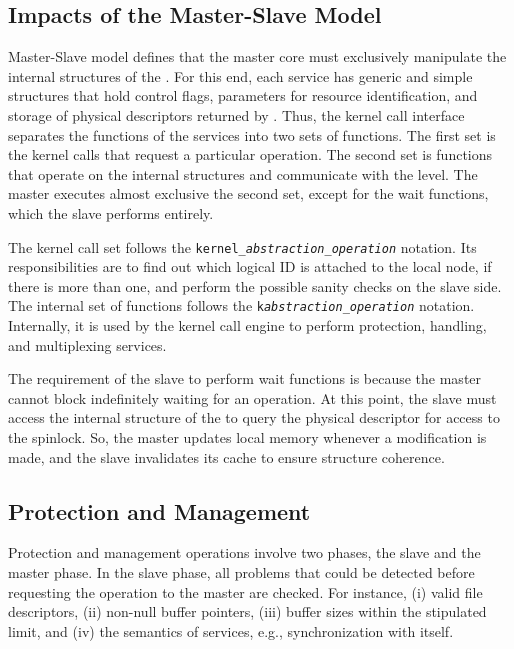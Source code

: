 		\subsection{Impacts of the Master-Slave Model}

			Master-Slave model defines that the master core must exclusively manipulate
			the internal structures of the \os. For this end, each service has generic and
			simple structures that hold control flags, parameters for resource
			identification, and storage of physical descriptors returned by \hal. Thus,
			the kernel call interface separates the functions of the services into two
			sets of functions. The first set is the kernel calls that request a particular
			operation. The second set is functions that operate on the internal structures
			and communicate with the \hal level. The master executes almost exclusive
			the second set, except for the wait functions, which the slave performs entirely.

			The kernel call set follows the \texttt{kernel\_\textit{abstraction}\_\textit{operation}}
			notation. Its responsibilities are to find out which logical ID is attached to
			the local node, if there is more than one, and perform the possible sanity
			checks on the slave side. The internal set of functions follows the
			\texttt{k\textit{abstraction}\_\textit{operation}} notation. Internally, it
			is used by the kernel call engine to perform protection, handling, and
			multiplexing services. 

			The requirement of the slave to perform wait functions is because the master
			cannot block indefinitely waiting for an operation. At this point, the slave
			must access the internal structure of the \os to query the physical descriptor
			for access to the \hal spinlock. So, the master updates local memory whenever
			a modification is made, and the slave invalidates its cache to ensure structure
			coherence.

		\subsection{Protection and Management}

			Protection and management operations involve two phases, the slave and the master phase.
			In the slave phase, all problems that could be detected before requesting the operation
			to the master are checked.
			For instance,
			(i) valid file descriptors,
			(ii) non-null buffer pointers,
			(iii) buffer sizes within the stipulated limit, and
			(iv) the semantics of services, e.g., synchronization with itself.

